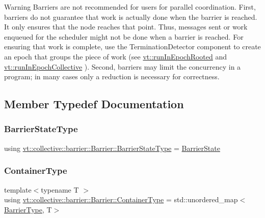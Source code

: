\begin{DoxyWarning}{Warning}
Barriers are not recommended for users for parallel coordination. First, barriers do not guarantee that work is actually done when the barrier is reached. It only ensures that the node reaches that point. Thus, messages sent or work enqueued for the scheduler might not be done when a barrier is reached. For ensuring that work is complete, use the {\ttfamily Termination\+Detector} component to create an epoch that groups the piece of work (see {\ttfamily \hyperlink{namespacevt_ad419c00d2e4ac8601ea3b1dec633f3f7}{vt\+::run\+In\+Epoch\+Rooted}} and {\ttfamily \hyperlink{namespacevt_a291cca514e6f66292df339cd92a54502}{vt\+::run\+In\+Epoch\+Collective}} ). Second, barriers may limit the concurrency in a program; in many cases only a reduction is necessary for correctness. 
\end{DoxyWarning}


\subsection{Member Typedef Documentation}
\mbox{\label{structvt_1_1collective_1_1barrier_1_1_barrier_a9b612818f7b44ca65f2caee0dee094f3}} 
\subsubsection{\texorpdfstring{Barrier\+State\+Type}{BarrierStateType}}
{\footnotesize\ttfamily using \hyperlink{structvt_1_1collective_1_1barrier_1_1_barrier_a9b612818f7b44ca65f2caee0dee094f3}{vt\+::collective\+::barrier\+::\+Barrier\+::\+Barrier\+State\+Type} =  \hyperlink{structvt_1_1collective_1_1barrier_1_1_barrier_state}{Barrier\+State}}

\mbox{\label{structvt_1_1collective_1_1barrier_1_1_barrier_a84bfbd26a48a1c3bb7272e81245e4873}} 
\subsubsection{\texorpdfstring{Container\+Type}{ContainerType}}
{\footnotesize\ttfamily template$<$typename T $>$ \\
using \hyperlink{structvt_1_1collective_1_1barrier_1_1_barrier_a84bfbd26a48a1c3bb7272e81245e4873}{vt\+::collective\+::barrier\+::\+Barrier\+::\+Container\+Type} =  std\+::unordered\+\_\+map$<$\hyperlink{namespacevt_a25e481f0d6bbc7204db23d1c87a62e77}{Barrier\+Type}, T$>$}



